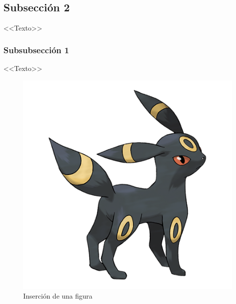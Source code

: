 \begin{multicols}{2}

\subsection{Subsección 2}

<<Texto>>

\subsubsection{Subsubsección 1}

<<Texto>>

\begin{figure}[H]
    \centering
    \includegraphics[scale=0.32]{pollito.png}
    \caption{Inserción de una figura}
    \label{figura}
\end{figure}


\end{multicols}
